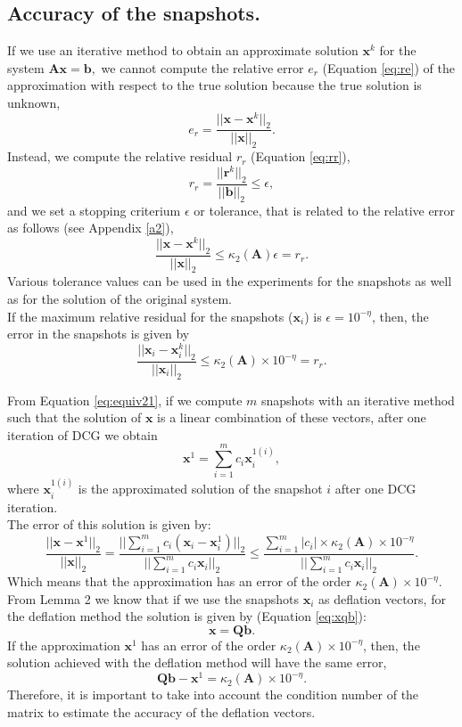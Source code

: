 \documentclass[review]{elsarticle}
\begin{document}
\subsection{Accuracy of the snapshots.}\label{accs}
If we use an iterative method to obtain an approximate solution $\mathbf{x}^k$ for the system $\mathbf{A}\mathbf{x}=\mathbf{b},$ we cannot compute the relative error $e_r$
(Equation \eqref{eq:re}) of the approximation with respect to the true solution because the true solution is unknown, 
\begin{equation}\label{eq:re}
 e_r=\frac{||\mathbf{x}-\mathbf{x}^k||_2}{||\mathbf{x}||_2}.
\end{equation}
Instead, we compute the relative residual $r_r$ (Equation \eqref{eq:rr}), 
\begin{equation}\label{eq:rr}
r_r= \frac{||\mathbf{r}^k||_2}{||\mathbf{b}||_2}\leq \epsilon,
\end{equation}
and we set a stopping criterium $\epsilon$ or tolerance, that is related to the relative error as follows \cite{Saad03} (see Appendix \ref{a2}),
$$\frac{||\mathbf{x}-\mathbf{x}^k||_2}{||\mathbf{x}||_2}\leq \kappa_2(\mathbf{A}) \epsilon=r_r.$$
Various tolerance values can be used in the experiments for the snapshots as well as for the solution of the original system. \\
If the maximum relative residual for the snapshots ($\mathbf{x}_i$) is $\epsilon=10^{-\eta}$, then, the error in the snapshots is given by
$$\frac{||\mathbf{x}_i-\mathbf{x}_i^k||_2}{||\mathbf{x}_i||_2}\leq \kappa_2(\mathbf{A})\times 10^{-\eta}=r_r.$$

From Equation \eqref{eq:equiv21}, if we compute $m$ snapshots with an iterative method such that the solution of $\mathbf{x}$ is a linear combination of these vectors, after one iteration of DCG we obtain
$$\mathbf{x}^{1}=\sum_{i=1}^m {c}_i\mathbf{x}_i^{1(i)},$$
where $\mathbf{x}_i^{1(i)}$ is the approximated solution of the snapshot $i$ after one DCG iteration.\\ 
The error of this solution is given by:
$$\frac{||\mathbf{x}-\mathbf{x}^1||_2}{||\mathbf{x}||_2}=
\frac{||\sum_{i=1}^m {c}_i(\mathbf{x}_i-\mathbf{x}_i^{1})||_2}{||\sum_{i=1}^m {c}_i\mathbf{x}_i||_2}\leq
\frac{\sum_{i=1}^m| {c}_i|\times \kappa_2(\mathbf{A})\times 10^{-\eta}}{||\sum_{i=1}^m {c}_i\mathbf{x}_i||_2}.
$$
Which means that the approximation has an error of the order $\kappa_2(\mathbf{A})\times10^{-\eta}.$
\\From Lemma 2 we know that if we use the snapshots $\mathbf{x}_i$ as deflation vectors, for the deflation method the solution is given by (Equation \eqref{eq:xqb}): $$\mathbf{x}=\mathbf{Q}\mathbf{b}.$$ 
If the approximation $\mathbf{x}^1$ has an error of the order $\kappa_2(\mathbf{A})\times10^{-\eta}$, then, the solution achieved with the deflation method will have the same error, 
$$\mathbf{Q}\mathbf{b}-\mathbf{x}^1=\kappa_2(\mathbf{A})\times10^{-\eta}.$$
Therefore, it is important to take into account the condition number of the matrix to estimate the accuracy of the deflation vectors.
\end{document}
